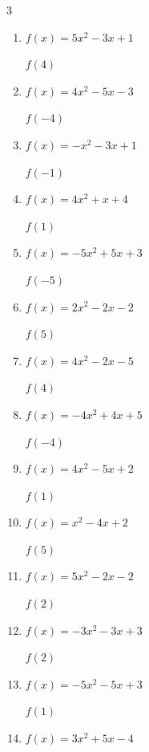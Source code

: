 \begin{multicols}{3}
\begin{enumerate}
$f(-4)$
        \phantom{$= -47$}

  \item $f(x)=5x^{2}-3x+1$

$f(4)$
        \phantom{$= 69$}

  \item $f(x)=4x^{2}-5x-3$

$f(-4)$
        \phantom{$= 81$}

  \item $f(x)=-x^{2}-3x+1$

$f(-1)$
        \phantom{$= 3$}

  \item $f(x)=4x^{2}+x+4$

$f(1)$
        \phantom{$= 9$}

  \item $f(x)=-5x^{2}+5x+3$

$f(-5)$
        \phantom{$= -147$}

  \item $f(x)=2x^{2}-2x-2$

$f(5)$
        \phantom{$= 38$}

  \item $f(x)=4x^{2}-2x-5$

$f(4)$
        \phantom{$= 51$}

  \item $f(x)=-4x^{2}+4x+5$

$f(-4)$
        \phantom{$= -75$}

  \item $f(x)=4x^{2}-5x+2$

$f(1)$
        \phantom{$= 1$}

  \item $f(x)=x^{2}-4x+2$

$f(5)$
        \phantom{$= 7$}

  \item $f(x)=5x^{2}-2x-2$

$f(2)$
        \phantom{$= 14$}

  \item $f(x)=-3x^{2}-3x+3$

$f(2)$
        \phantom{$= -15$}

  \item $f(x)=-5x^{2}-5x+3$

$f(1)$
        \phantom{$= -7$}

\columnbreak %

\resetques

  \item $f(x)=3x^{2}+5x-4$


\end{enumerate}
\end{multicols}
